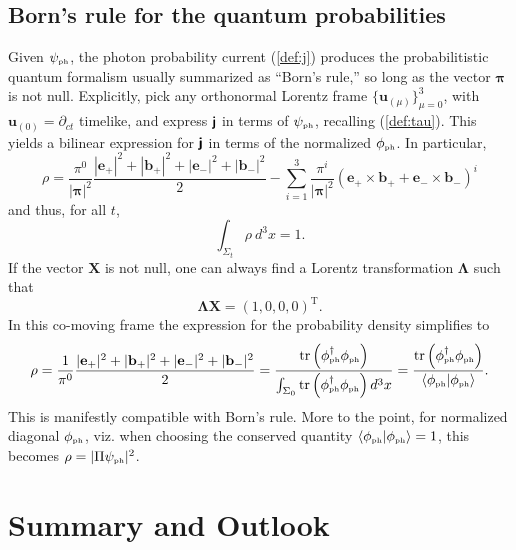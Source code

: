 \documentclass[11pt]{article}
\theoremstyle{definition}
\DeclareMathOperator{\tr}{tr}
\newcommand{\refeq}[1]{(\ref{#1})}
\newcommand{\tenseur}[1]{{\textbf{\textsf{#1}}}}
\newcommand{\bMj}{{\tenseur{j}}}
\newcommand{\bpi}{\boldsymbol{\pi}}
\numberwithin{equation}{section}
\newcommand{\bb}{\mathbf{b}}
\newcommand{\be}{\mathbf{e}}
\newcommand{\bu}{\mathbf{u}}
\newcommand{\bX}{\mathbf{X}}
\newcommand{\beq}{\begin{equation}}
\newcommand{\eeq}{\end{equation}}
\newcommand{\p}{\partial}
\newcommand{\bLa}{\boldsymbol{\Lambda}}
\newcommand{\psiPH}{{\psi_{\mbox{\rm\tiny ph}}}}
\newcommand{\phiPH}{{\phi_{\mbox{\rm\tiny ph}}}}
\newcommand{\Si}{\Sigma}
\begin{document}
\subsection{Born's rule for the quantum probabilities}\label{sec:Bornrule}\vspace{-5pt}

Given $\psiPH$, the photon probability current \refeq{def:j} 
produces the probabilitistic quantum formalism usually summarized as ``Born's rule,'' so long as the vector $\bpi$ is not null.
 Explicitly, pick any orthonormal Lorentz frame $\{\bu_{(\mu)}\}_{\mu = 0}^3$, with $\bu_{(0)}=\p_{ct}$ timelike, 
and express $\bMj$ in terms of $\psiPH$, recalling \refeq{def:tau}.
 This yields a bilinear expression for $\bMj$ in terms of the normalized $\phiPH$. 
  In particular,
\beq
\rho  =  \frac{\pi^0}{|\bpi|^2} \frac{|\be_+|^2 + |\bb_+|^2 + |\be_-|^2 + |\bb_-|^2}{2}  -
 \sum_{i=1}^3 \frac{\pi^i}{|\bpi|^2} \left( \be_+\times \bb_+ + \be_-\times\bb_- \right)^i
\eeq
and thus, for all $t$,
\beq
\int_{\Si_t} \rho\  d^3x = 1.
\eeq
 If the vector $\bX$ is not null, one can always find a Lorentz transformation $\bLa$ such that 
\beq
\bLa \bX = \left(1, 0, 0, 0\right)^{\mathrm{T}}.
\eeq 
 In this co-moving frame the expression for the probability density simplifies to
\beq
\rho = \frac{1}{\pi^0} \frac{|\be_+|^2 + |\bb_+|^2 + |\be_-|^2 + |\bb_-|^2}{2}
 =
 \frac{ \tr\left ({\phi^\dagger_{\mbox{\rm\tiny ph}}}\phiPH\right)}{\int_{\Si_0} \tr\left ({\phi^\dagger_{\mbox{\rm\tiny ph}}}\phiPH\right) d^3x} =
 \frac{\tr\left ({\phi^\dagger_{\mbox{\rm\tiny ph}}}\phiPH\right)}{\langle \phiPH | \phiPH \rangle}.
\eeq
 This is manifestly compatible with Born's rule.
 More to the point, for normalized diagonal $\phiPH$, viz. when choosing the conserved quantity $\langle\phiPH | \phiPH\rangle=1$, 
this becomes $\rho = |\Pi\psiPH|^2$.\vspace{-10pt}


\section{Summary and Outlook}\label{sec:conclusions}\vspace{-5pt}
\end{document}
